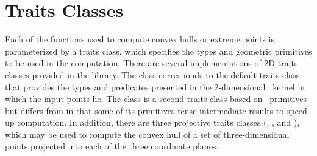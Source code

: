\section{Traits Classes}

Each of the functions used to compute convex hulls or extreme points
is parameterized by a traits class, which specifies the types and geometric
primitives to be used in the computation.  There are several implementations 
of 2D traits classes provided in the library.  The class
corresponds to the default traits class that provides the types and 
predicates presented in the 2-dimensional \cgal\ kernel in which the input 
points lie.  The class 
is a second traits class based on \cgal\ primitives but differs from
 in that some of its primitives reuse
intermediate results to speed up computation.
In addition, there are three projective traits classes 
(, 
, and 
), %
%
%
%
which may be used to compute the convex hull of a set of three-dimensional
points projected into each of the three coordinate planes.


